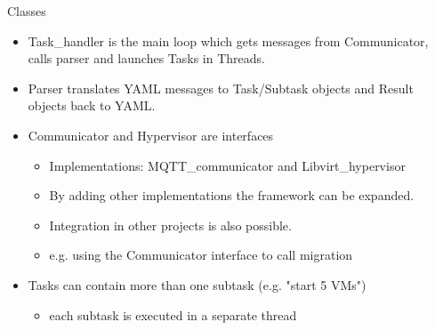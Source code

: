 \documentclass[10pt, aspectratio=1610]{beamer}
\begin{document}
\begin{frame}{Classes}
	\begin{itemize}
		\item Task\_handler is the main loop which gets messages from Communicator, calls parser and launches Tasks in Threads.
		\item Parser translates YAML messages to Task/Subtask objects and Result objects back to YAML.
		\item Communicator and Hypervisor are interfaces
			\begin{itemize}
				\item Implementations: MQTT\_communicator and Libvirt\_hypervisor
			\item By adding other implementations the framework can be expanded.
			\item Integration in other projects is also possible.
			\item e.g. using the Communicator interface to call migration
		\end{itemize}
		\item Tasks can contain more than one subtask (e.g. "start 5 VMs")
			\begin{itemize}
				\item each subtask is executed in a separate thread
			\end{itemize}
	\end{itemize}
\end{frame}
\end{document}
